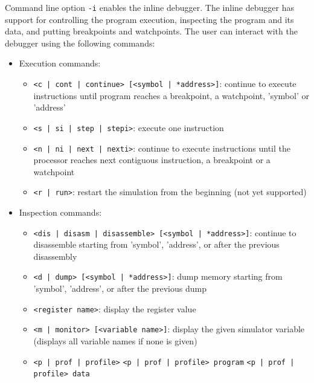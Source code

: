 Command line option \texttt{-i} enables the inline debugger. The inline debugger has support for controlling the program execution, inspecting the program and its data, and putting breakpoints and watchpoints. The user can interact with the debugger using the following commands:
\begin{itemize}
\item Execution commands:
	\begin{itemize}
	\item \texttt{<c | cont | continue> [<symbol | *address>]}: \newline
	continue to execute instructions until program reaches a breakpoint, a watchpoint, 'symbol' or 'address'
	\item \texttt{<s | si | step | stepi>}: \newline
	execute one instruction
	\item \texttt{<n | ni | next | nexti>}: \newline
	continue to execute instructions until the processor reaches next contiguous instruction, a breakpoint or a watchpoint
	\item \texttt{<r | run>}: \newline
	restart the simulation from the beginning (not yet supported)
	\end{itemize}
\item Inspection commands:
	\begin{itemize}
	\item \texttt{<dis | disasm | disassemble> [<symbol | *address>]}: \newline
	continue to disassemble starting from 'symbol', 'address', or after the previous disassembly
	\item \texttt{<d | dump> [<symbol | *address>]}: \newline
	dump memory starting from 'symbol', 'address', or after the previous dump
	\item \texttt{<register name>}: \newline
	display the register value
	\item \texttt{<m | monitor> [<variable name>]}: \newline
	display the given simulator variable (displays all variable names if none is given)
	\item \texttt{<p | prof | profile>} \newline
	\texttt{<p | prof | profile> program} \newline
	\texttt{<p | prof | profile> data} \newline

\end{itemize}
\end{itemize}
